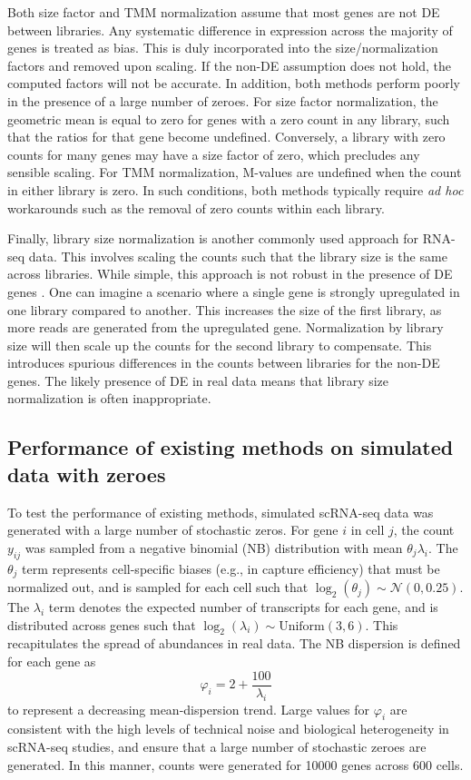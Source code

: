 \documentclass{article}
\begin{document}
Both size factor and TMM normalization assume that most genes are not DE between libraries.
Any systematic difference in expression across the majority of genes is treated as bias.
This is duly incorporated into the size/normalization factors and removed upon scaling.
If the non-DE assumption does not hold, the computed factors will not be accurate.
In addition, both methods perform poorly in the presence of a large number of zeroes.
For size factor normalization, the geometric mean is equal to zero for genes with a zero count in any library, such that the ratios for that gene become undefined.
Conversely, a library with zero counts for many genes may have a size factor of zero, which precludes any sensible scaling.
For TMM normalization, M-values are undefined when the count in either library is zero.
In such conditions, both methods typically require \textit{ad hoc} workarounds such as the removal of zero counts within each library.

Finally, library size normalization is another commonly used approach for RNA-seq data.
This involves scaling the counts such that the library size is the same across libraries.
While simple, this approach is not robust in the presence of DE genes \cite{robinson2010scaling}.
One can imagine a scenario where a single gene is strongly upregulated in one library compared to another.
This increases the size of the first library, as more reads are generated from the upregulated gene.
Normalization by library size will then scale up the counts for the second library to compensate.
This introduces spurious differences in the counts between libraries for the non-DE genes.
The likely presence of DE in real data means that library size normalization is often inappropriate.

\subsection{Performance of existing methods on simulated data with zeroes}
To test the performance of existing methods, simulated scRNA-seq data was generated with a large number of stochastic zeros.
For gene $i$ in cell $j$, the count $y_{ij}$ was sampled from a negative binomial (NB) distribution with mean $\theta_{j}\lambda_{i}$.
The $\theta_{j}$ term represents cell-specific biases (e.g., in capture efficiency) that must be normalized out, 
    and is sampled for each cell such that $\log_2(\theta_j) \sim \mathcal{N}(0, 0.25)$.
The $\lambda_{i}$ term denotes the expected number of transcripts for each gene, and is distributed across genes such that $\log_2(\lambda_i) \sim \mbox{Uniform}(3, 6)$.
This recapitulates the spread of abundances in real data.
The NB dispersion is defined for each gene as 
\[
    \varphi_i = 2 + \frac{100}{\lambda_i}
\]
to represent a decreasing mean-dispersion trend.
Large values for $\varphi_i$ are consistent with the high levels of technical noise and biological heterogeneity in scRNA-seq studies,
    and ensure that a large number of stochastic zeroes are generated.
In this manner, counts were generated for 10000 genes across 600 cells.
\end{document}
